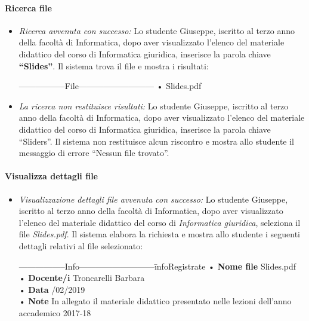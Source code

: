 \paragraph{Ricerca file}
\begin{itemize}
	\item \textit{Ricerca avvenuta con successo:}
	Lo studente Giuseppe, iscritto al terzo anno della  facoltà di Informatica, dopo aver visualizzato l’elenco del materiale didattico del corso di Informatica giuridica, inserisce la parola chiave \textbf{“Slides”}. Il sistema trova il file e mostra i risultati:   
	\begin{tabbing}
		\hspace{1cm}-----------------File---------------------------\kill
		\hspace{1cm} • Slides.pdf  \\
	\end{tabbing} 
	
	\item \textit{La ricerca non restituisce risultati:}
	Lo studente Giuseppe, iscritto al terzo anno della facoltà di Informatica, dopo aver visualizzato l’elenco del materiale didattico del corso di Informatica giuridica, inserisce la parola chiave “Sliders”. Il sistema non restituisce alcun riscontro e mostra allo studente il messaggio di errore “Nessun file trovato”.
\end{itemize}

\paragraph{Visualizza dettagli file}
\begin{itemize}
	\item \textit{Visualizzazione dettagli file avvenuta con successo:}
	Lo studente Giuseppe, iscritto al terzo anno della facoltà di Informatica, dopo aver visualizzato l’elenco del materiale didattico del corso di \textit{Informatica giuridica}, seleziona il file \textit{Slides.pdf}. Il sistema elabora la richiesta e mostra allo studente i seguenti dettagli relativi al file selezionato:
	\begin{tabbing}
		\hspace{1cm}-----------------Info---------------------------\= infoRegistrate\kill
		\hspace{1cm} • \textbf{Nome file} \> Slides.pdf  \\
		\hspace{1cm} • \textbf{Docente/i} \> Troncarelli Barbara  \\
		\hspace{1cm} • \textbf{Data} /02/2019  \\
		\hspace{1cm} • \textbf{Note} \> In allegato il materiale didattico presentato nelle lezioni dell'anno accademico 2017-18  \\
	\end{tabbing} 
\end{itemize}

